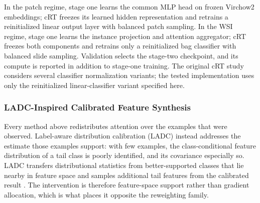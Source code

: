 \documentclass[11pt]{article}
\begin{document}
In the patch regime, stage one learns the common MLP head on frozen Virchow2 embeddings; cRT freezes its learned hidden representation and retrains a reinitialized linear output layer with balanced patch sampling. In the WSI regime, stage one learns the instance projection and attention aggregator; cRT freezes both components and retrains only a reinitialized bag classifier with balanced slide sampling. Validation selects the stage-two checkpoint, and its compute is reported in addition to stage-one training. The original cRT study considers several classifier normalization variants; the tested implementation uses only the reinitialized linear-classifier variant specified here.

\subsubsection{LADC-Inspired Calibrated Feature Synthesis}
\label{sec:ladc}
Every method above redistributes attention over the examples that were observed. Label-aware distribution calibration (LADC) instead addresses the estimate those examples support: with few examples, the class-conditional feature distribution of a tail class is poorly identified, and its covariance especially so. LADC transfers distributional statistics from better-supported classes that lie nearby in feature space and samples additional tail features from the calibrated result \citep{wang2024ladc}. The intervention is therefore feature-space support rather than gradient allocation, which is what places it opposite the reweighting family.
\end{document}
